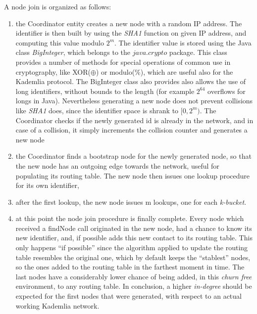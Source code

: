 \documentclass[11pt, a4paper]{report}
\begin{document}
	A node join is organized as follows:
	\begin{enumerate}
		\item the Coordinator entity creates a new node with a random IP address. The identifier is then built by using the \emph{SHA1} function on given IP address, and computing this value modulo $2^m$. The identifier value is stored using the Java class \emph{BigInteger}, which belongs to the $java.crypto$ package. This class provides a number of methods for special operations of common use in cryptography, like XOR($\oplus$) or modulo($\%$), which are useful also for the Kademlia protocol. The BigInteger class also provides also allows the use of long identifiers, without bounds to the length (for example $2^{64}$ overflows for longs in Java). Nevertheless generating a new node does not prevent collisions like \emph{SHA1} does, since the identifier space is shrank to $[0, 2^m)$. The Coordinator checks if the newly generated id is already in the network, and in case of a collision, it simply increments the collision counter and generates a new node
		\item the Coordinator finds a bootstrap node for the newly generated node, so that the new node has an outgoing edge towards the network, useful for populating its routing table. The new node then issues one lookup procedure for its own identifier, 
		\item after the first lookup, the new node issues m lookups, one for each \emph{k-bucket}.
		\item at this point the node join procedure is finally complete. Every node which received a findNode call originated in the new node, had a chance to know its new identifier, and, if possible adds this new contact to its routing table. This only happens “if possible” since the algorithm applied to update the routing table resembles the original one, which by default keeps the “stablest” nodes, so the ones added to the routing table in the farthest moment in time.
		The last nodes have a considerably lower chance of being added, in this \emph{churn free} environment, to any routing table. In conclusion, a higher \emph{in-degree} should be expected for the first nodes that were generated, with respect to an actual working Kademlia network.
	\end{enumerate}
\end{document}
